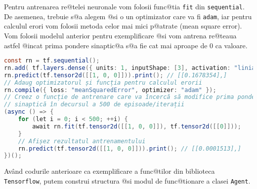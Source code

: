 Pentru antrenarea re@telei neuronale vom folosii func@tia \texttt{fit} din \texttt{sequential}. De asemenea, trebuie s@a alegem @si o un optimizator care va fi \texttt{adam}, iar pentru calculul erori vom folosii metoda celor mai mici p@atrate (mean square error). Vom folosii modelul anterior pentru exemplificare @si vom antrena re@teaua astfel @incat prima pondere sinaptic@a s@a fie cat mai aproape de 0 ca valoare.

\begin{lstlisting}[language=Java, caption={Exemplu de antrenare a unei simple rețele neuronale cu funcție de activare}]
const rn = tf.sequential();
rn.add( tf.layers.dense({ units: 1, inputShape: [3], activation: "liniar", useBias: false }) );
rn.predict(tf.tensor2d([[1, 0, 0]])).print(); // [[0.1678354],] 
// Adaug optimizatorul și funcția pentru calculul erorii
rn.compile({ loss: "meanSquaredError", optimizer: "adam" });
// Creez o funcție de antrenare care va încercă să modifice prima pondere 
// sinaptică în decursul a 500 de episoade/iterații
(async () => {
	for (let i = 0; i < 500; ++i) {
		await rn.fit(tf.tensor2d([[1, 0, 0]]), tf.tensor2d([[0]]));
	}
	// Afișez rezultatul antrenamentului
	rn.predict(tf.tensor2d([[1, 0, 0]])).print(); // [[0.0001513],]
})();
\end{lstlisting}

Av\^ and codurile anterioare ca exemplificare a func@tilor din biblioteca \texttt{Tensorflow}, putem construi structura @si modul de func@tionare a clasei \texttt{Agent}.

